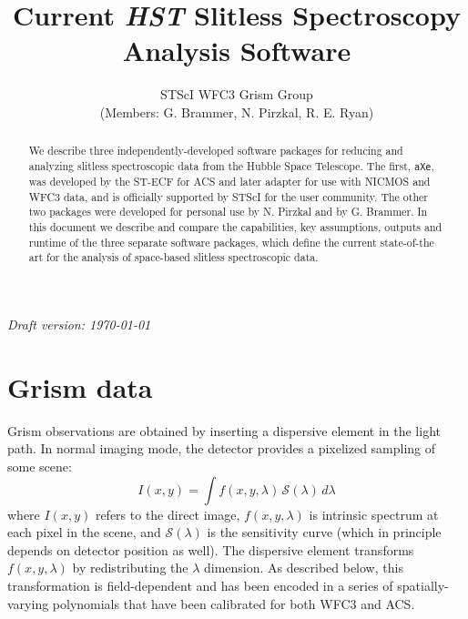 \documentclass[preprint]{aastex}
\begin{document}
\title{Current \textit{HST} Slitless Spectroscopy Analysis Software}

\author{STScI WFC3 Grism Group \\ (Members: G. Brammer, N. Pirzkal, R. E. Ryan)}

\begin{abstract}
    
    We describe three independently-developed software packages for reducing and analyzing slitless spectroscopic data from the Hubble Space Telescope.  The first, \texttt{aXe}, was developed by the ST-ECF for ACS and later adapter for use with NICMOS and WFC3 data,  and is officially supported by STScI for the user community.  The other two packages were developed for personal use by N. Pirzkal and by G. Brammer.  In this document we describe and compare the capabilities, key assumptions, outputs and runtime of the three separate software packages, which define the current state-of-the art for the analysis of space-based slitless spectroscopic data.
    

    
    
    
\end{abstract}

\textit{Draft version: \today}

\section{Grism data}




Grism observations are obtained by inserting a dispersive element in the light path.  In normal imaging mode, the detector provides a pixelized sampling of some scene:
\begin{dmath}
I(x,y) = \int f(x,y,\lambda)\,\mathcal{S}(\lambda)\,d\lambda
\end{dmath}
where $I(x,y)$ refers to the direct image, $f(x,y,\lambda)$ is intrinsic spectrum at each pixel in the scene, and $\mathcal{S}(\lambda)$ is the sensitivity curve (which in principle depends on detector position as well). The dispersive element transforms $f(x,y,\lambda)$ by redistributing the $\lambda$ dimension.  As described below, this transformation is field-dependent and has been encoded in a series of spatially-varying polynomials that have been calibrated for both WFC3 and ACS.
\end{document}
